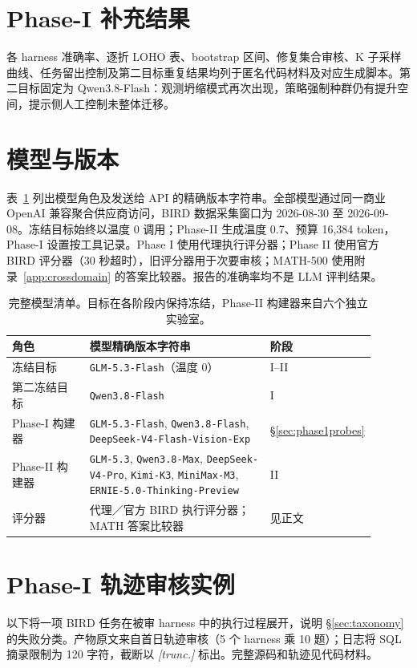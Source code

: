 \section{Phase-I 补充结果}\label{app:phase1-results}
各 harness 准确率、逐折 LOHO 表、bootstrap 区间、修复集合审核、K 子采样曲线、任务留出控制及第二目标重复结果均列于匿名代码材料及对应生成脚本。第二目标固定为 Qwen3.8-Flash：观测坍缩模式再次出现，策略强制种群仍有提升空间，提示侧人工控制未整体迁移。

\section{模型与版本}\label{app:models}
表~\ref{tab:models} 列出模型角色及发送给 API 的精确版本字符串。全部模型通过同一商业 OpenAI 兼容聚合供应商访问，BIRD 数据采集窗口为 2026-08-30 至 2026-09-08。冻结目标始终以温度 0 调用；Phase-II 生成温度 0.7、预算 16,384 token，Phase-I 设置按工具记录。Phase I 使用代理执行评分器；Phase II 使用官方 BIRD 评分器（30 秒超时），旧评分器用于次要审核；MATH-500 使用附录~\ref{app:crossdomain} 的答案比较器。报告的准确率均不是 LLM 评判结果。
\begin{table}[h]\centering\small
\begin{tabular}{p{0.22\linewidth}p{0.52\linewidth}p{0.16\linewidth}}\toprule
角色 & 模型精确版本字符串 & 阶段 \\\midrule
冻结目标 & \texttt{GLM-5.3-Flash}（温度 0） & I--II \\
第二冻结目标 & \texttt{Qwen3.8-Flash} & I \\
Phase-I 构建器 & \texttt{GLM-5.3-Flash}, \texttt{Qwen3.8-Flash}, \texttt{DeepSeek-V4-Flash-Vision-Exp} & \S\ref{sec:phase1probes} \\
Phase-II 构建器 & \texttt{GLM-5.3}, \texttt{Qwen3.8-Max}, \texttt{DeepSeek-V4-Pro}, \texttt{Kimi-K3}, \texttt{MiniMax-M3}, \texttt{ERNIE-5.0-Thinking-Preview} & II \\
评分器 & 代理／官方 BIRD 执行评分器；MATH 答案比较器 & 见正文 \\\bottomrule
\end{tabular}
\caption{完整模型清单。目标在各阶段内保持冻结，Phase-II 构建器来自六个独立实验室。}\label{tab:models}
\end{table}

\section{Phase-I 轨迹审核实例}\label{app:examples}
以下将一项 BIRD 任务在被审 harness 中的执行过程展开，说明 \S\ref{sec:taxonomy} 的失败分类。产物原文来自首日轨迹审核（5 个 harness 乘 10 题）；日志将 SQL 摘录限制为 120 字符，截断以 \emph{[trunc.]} 标出。完整源码和轨迹见代码材料。
